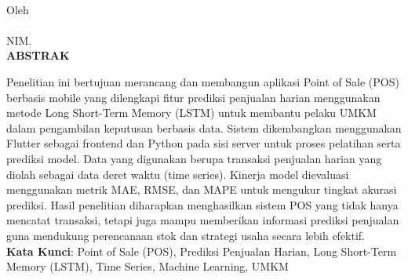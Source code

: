 \clearpage
{}
{}
\begin{center}
    \textbf{\large{\MakeUppercase{\judulid}}}\\[0.5cm]
    Oleh\\
    \textbf{\penulis}\\
    NIM. \textbf{\nim}\\[2em]
    \textbf{ABSTRAK}\\[0.5cm]
\end{center}

Penelitian ini bertujuan merancang dan membangun aplikasi Point of Sale (POS) berbasis mobile yang dilengkapi fitur prediksi penjualan harian menggunakan metode Long Short-Term Memory (LSTM) untuk membantu pelaku UMKM dalam pengambilan keputusan berbasis data. Sistem dikembangkan menggunakan Flutter sebagai frontend dan Python pada sisi server untuk proses pelatihan serta prediksi model. Data yang digunakan berupa transaksi penjualan harian yang diolah sebagai data deret waktu (time series). Kinerja model dievaluasi menggunakan metrik MAE, RMSE, dan MAPE untuk mengukur tingkat akurasi prediksi. Hasil penelitian diharapkan menghasilkan sistem POS yang tidak hanya mencatat transaksi, tetapi juga mampu memberikan informasi prediksi penjualan guna mendukung perencanaan stok dan strategi usaha secara lebih efektif.\\[0.6cm]

\noindent \textbf{Kata Kunci}: Point of Sale (POS), Prediksi Penjualan Harian, Long Short-Term Memory (LSTM), Time Series, Machine Learning, UMKM
